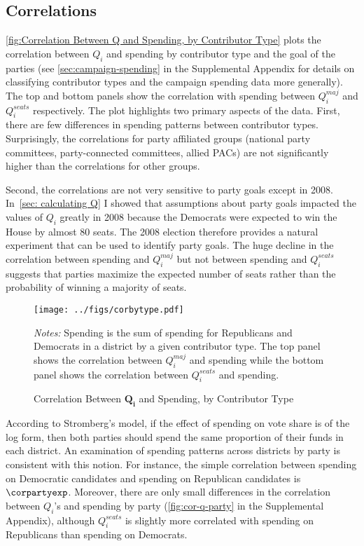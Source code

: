 \documentclass[12pt,final,fleqn]{article}
\theoremstyle{plain}
\begin{document}
\subsection{Correlations}
\autoref{fig:Correlation Between Q and Spending, by Contributor Type} plots the correlation between $Q_i$ and spending by contributor type and the goal of the parties (see \autoref*{sec:campaign-spending} in the Supplemental Appendix for details on classifying contributor types and the campaign spending data more generally). The top and bottom panels show the correlation with spending between $Q_i^{maj}$ and $Q_i^{seats}$ respectively. The plot highlights two primary aspects of the data. First, there are few differences in spending patterns between contributor types. Surprisingly, the correlations for party affiliated groups (national party committees, party-connected committees, allied PACs) are not significantly higher than the correlations for other groups. 

Second, the correlations are not very sensitive to party goals except in 2008. In~\autoref{sec: calculating Q} I showed that assumptions about party goals impacted the values of $Q_i$ greatly in 2008 because the Democrats were expected to win the House by almost 80 seats. The 2008 election therefore provides a natural experiment that can be used to identify party goals. The huge decline in the correlation between spending and $Q_i^{maj}$ but not between spending and $Q_i^{seats}$ suggests that parties maximize the expected number of seats rather than the probability of winning a majority of seats. 

\begin{figure}[!htb]
\texttt{[image: ../figs/corbytype.pdf]}
\vspace{.5cm}
\caption{Correlation Between $\mathbf{Q_i}$ and Spending, by Contributor Type}
\label{fig:Correlation Between Q and Spending, by Contributor Type}
\begin{minipage}{\linewidth}
\footnotesize
\emph{Notes:} Spending is the sum of spending for Republicans and Democrats in a district by a given contributor type. The top panel shows the correlation between $Q_i^{maj}$ and spending while the bottom panel shows the correlation between $Q_i^{seats}$ and spending.
\end{minipage}
\end{figure}

According to Stromberg's model, if the effect of spending on vote share is of the log form, then both parties should spend the same proportion of their funds in each district. An examination of spending patterns across districts by party is consistent with this notion. For instance, the simple correlation between spending on Democratic candidates and spending on Republican candidates is $\corpartyexp$. Moreover, there are only small differences in the correlation between $Q_i$'s and spending by party (\autoref*{fig:cor-q-party} in the Supplemental Appendix), although $Q_i^{seats}$ is slightly more correlated with spending on Republicans than spending on Democrats.
\end{document}
